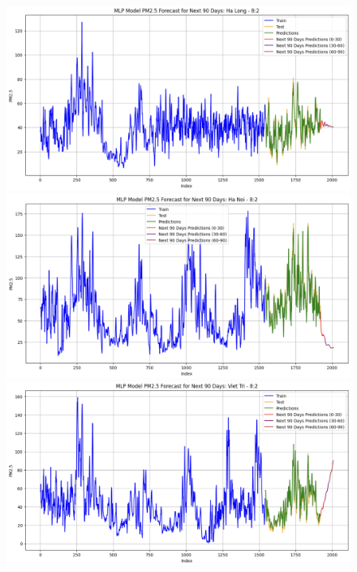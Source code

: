 \begin{figure}[H]
    \begin{minipage}{0.15\textwidth}
        \centering
        \includegraphics[width=1\textwidth]{img/final/MLP/90D/MLP_8_2_HL.png}
        \end{minipage}
        \hfill
        \begin{minipage}{0.15\textwidth}
        \centering
        \includegraphics[width=1\textwidth]{img/final/MLP/90D/MLP_8_2_HN.png}
        \end{minipage}
        \hfill
        \begin{minipage}{0.15\textwidth}
        \centering
        \includegraphics[width=1\textwidth]{img/final/MLP/90D/MLP_8_2_VT.png}
        \end{minipage}
        \hfill


\end{figure}

